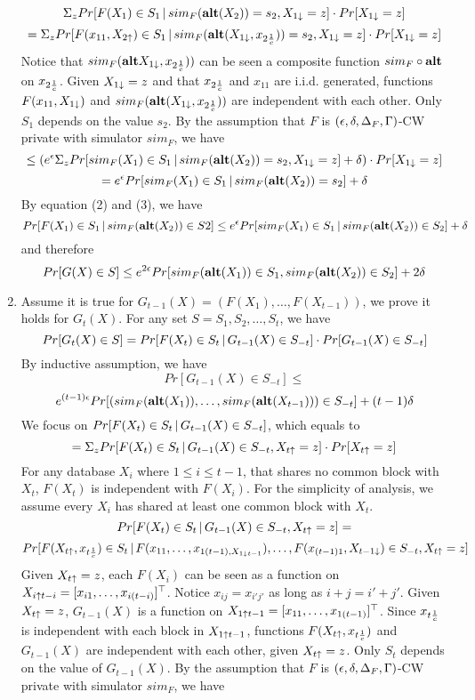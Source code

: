 \documentclass[11pt]{article}
\begin{document}
\begin{enumerate}
\[
\Sigma_{z} Pr[ F(X_{1}) \in S_{1}\,|\,sim_{F}({\bf alt}(X_{2})) = s_{2}, X_{1 \downarrow} =z] \cdot Pr[X_{1 \downarrow}=z]
\]
\[
=\Sigma_{z} Pr[ F(x_{11}, X_{2 \uparrow}) \in S_{1}\,|\,sim_{F}({\bf alt}(X_{1 \downarrow}, x_{2 \frac{1}{c}})) = s_{2}, X_{1 \downarrow} =z] \cdot Pr[X_{1 \downarrow}=z]
\]
Notice that $sim_{F}({\bf alt}X_{1 \downarrow}, x_{2 \frac{1}{c}}))$ can be seen a composite function $sim_{F} \circ {\bf alt}$ on $x_{2 \frac{1}{c}}$. Given $X_{1 \downarrow}=z$ and  that $x_{2 \frac{1}{c}}$ and $x_{11}$ are i.i.d. generated, functions $F(x_{11}, X_{1 \downarrow})$ and $sim_{F}({\bf alt}(X_{1 \downarrow}, x_{2 \frac{1}{c}}))$ are independent with each other. Only $S_{1}$ depends on the value $s_{2}$. By the assumption that $F$ is $(\epsilon, \delta, \Delta_{F}, \Gamma)$-CW private with simulator $sim_{F}$, we have
\[
\leq (e^{\epsilon} \Sigma_{z} Pr[ sim_{F}(X_{1}) \in S_{1}\,|\,sim_{F}({\bf alt}(X_{2})) = s_{2},X_{1 \downarrow} =z]+\delta) \cdot Pr[X_{1 \downarrow}=z]
\]
\[
=e^{\epsilon} Pr[ sim_{F}(X_{1}) \in S_{1}\,|\,sim_{F}({\bf alt}(X_{2})) = s_{2}]+\delta
\]
By equation (2) and (3), we have
\[
Pr[ F(X_{1}) \in S_{1}\,|\,sim_{F}({\bf alt}(X_{2})) \in S{2}] \leq e^{\epsilon} Pr[ sim_{F}(X_{1}) \in S_{1}\,|\,sim_{F}({\bf alt}(X_{2})) \in S_{2}]+\delta
\]
and therefore
\[
Pr[G(X) \in S] \leq e^{2\epsilon} Pr[sim_{F} ({\bf alt}(X_{1})) \in S_{1} , sim_{F} ({\bf alt}(X_{2})) \in S_{2}] + 2\delta
\]
\item Assume it is true for $G_{t-1}(X)=(F(X_{1}) , \dots, F(X_{t-1}))$, we prove it holds for $G_{t}(X)$. For any set $S={S_{1}, S_{2}, \dots, S_{t}}$, we have
\begin{equation}
Pr[G_{t}(X) \in S] = Pr[F(X_{t}) \in S_{t}\,|\, G_{t-1}(X) \in S_{-t}] \cdot Pr[ G_{t-1}(X) \in S_{-t}]
\end{equation}
By inductive assumption, we have
\[
Pr[ G_{t-1}(X) \in S_{-t}] \leq 
\]
\[
e^{(t-1) \epsilon} Pr [(sim_{F}({\bf alt}(X_{1})) , \dots , sim_{F}({\bf alt}(X_{t-1}))) \in S_{-t}] + (t-1)\delta
\]
We focus on $Pr[F(X_{t}) \in S_{t}\,|\, G_{t-1}(X) \in S_{-t}]$, which equals to
\[
=\Sigma_{z} Pr[F(X_{t}) \in S_{t}\,|\, G_{t-1}(X) \in S_{-t} , X_{t \uparrow}=z]\cdot Pr[X_{t \uparrow}=z]
\]
For any database $X_{i}$ where $1 \leq i \leq t-1$, that shares no common block with $X_{t}$, $F(X_{t})$ is independent with $F(X_{i})$. For the simplicity of analysis, we assume every $X_{i}$ has shared at least one common block with $X_{t}$. 
\[
Pr[F(X_{t}) \in S_{t}\,|\, G_{t-1}(X) \in S_{-t} , X_{t \uparrow}=z] =
\]
\[
Pr[F(X_{t \uparrow}, x_{t \frac{1}{c}}) \in S_{t}\,|\,F(x_{11},\dots, x_{1(t-1), X_{1 \downarrow t-1}}), \dots, F(x_{(t-1)1}, X_{t-1 \downarrow}) \in S_{-t}, X_{t \uparrow}=z]
\]
Given $X_{t \uparrow}=z$, each $F(X_{i})$ can be seen as a function on $X_{i \uparrow t-i}=[x_{i1},\dots , x_{i(t-i)}]^{\top}$. Notice $x_{ij}=x_{i'j'}$ as long as $i+j=i'+j'$. Given $X_{t \uparrow}=z$, $G_{t-1}(X)$ is a function on $X_{1 \uparrow t-1}=[x_{11},\dots , x_{1(t-1)}]^{\top}$. Since $x_{t \frac{1}{c}}$ is independent with each block in $X_{1 \uparrow t-1}$, functions $F(X_{t \uparrow}, x_{t \frac{1}{c}})$ and $G_{t-1}(X)$ are independent with each other, given $X_{t \uparrow}=z$. Only $S_{t}$ depends on the value of $G_{t-1}(X)$. By the assumption that $F$ is $(\epsilon, \delta, \Delta_{F}, \Gamma)$-CW private with simulator $sim_{F}$, we have

\end{enumerate}
\end{document}
